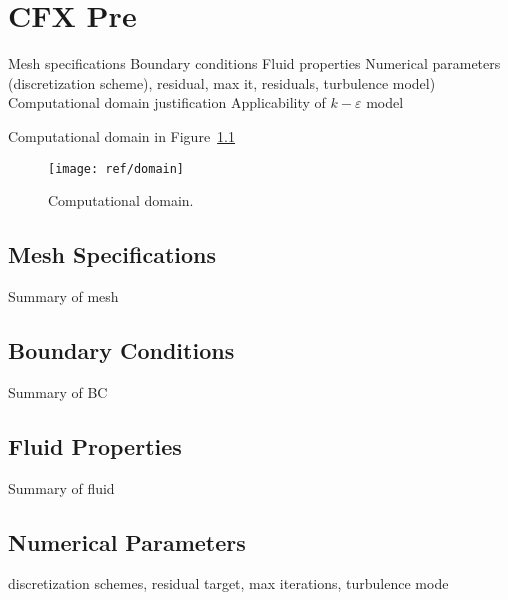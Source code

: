 \chapter{CFX Pre}
\label{ch:pre}

 Mesh specifications
 Boundary conditions
 Fluid properties
 Numerical parameters (discretization scheme), residual, max it, residuals, turbulence model)
 Computational domain justification 
 Applicability of $k-\varepsilon$ model


Computational domain in Figure~\ref{fig:domain}
\begin{figure}[H]
	\centering
	\texttt{[image: ref/domain]}
	\caption{Computational domain.}
	\label{fig:domain}
\end{figure}


\section{Mesh Specifications}
\label{sec:pre_mesh}

Summary of mesh



\section{Boundary Conditions}
\label{sec:pre_bc}

Summary of BC


\section{Fluid Properties}
\label{sec:pre_fluid}

Summary of fluid


\section{Numerical Parameters}
\label{sec:pre_num}

discretization	schemes, residual	target,	max	iterations,	turbulence mode


